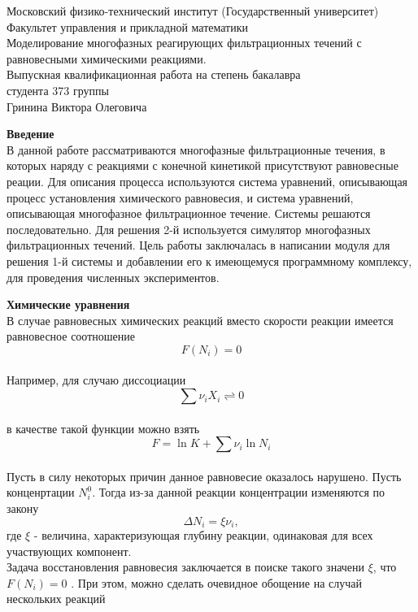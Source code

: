 \documentclass[10pt,a4paper]{article}
\begin{document}
\begin{center}
	Московский физико-технический институт (Государственный университет)\\
Факультет управления и прикладной математики\\
	\vspace{1cm} Моделирование многофазных реагирующих фильтрационных течений с 	равновесными химическими реакциями.\\
	\vspace{1cm}Выпускная квалификационная работа на степень бакалавра\\
			\vspace{1cm}студента 373 группы\\
	\vspace{1cm}Гринина Виктора Олеговича
	\vspace{4cm}
\end{center} 
\par\textbf{Введение}\\
В данной работе рассматриваются многофазные фильтрационные течения, в которых наряду с реакциями с конечной кинетикой присутствуют равновесные реации. Для описания процесса используются система уравнений, описывающая процесс установления химического равновесия, и система уравнений, описывающая  многофазное фильтрационное течение. Системы решаются последовательно. Для решения 2-й используется симулятор многофазных фильтрационных течений. Цель работы заключалась в написании модуля для решения 1-й системы и добавлении его к имеющемуся программному комплексу, для проведения численных экспериментов.
\par\textbf{Химические уравнения}\\
В случае равновесных химических реакций вместо скорости реакции имеется равновесное соотношение $$F(N_i) = 0$$\\
Например, для случаю диссоциации 
	$$\sum{\nu_i X_i} \rightleftharpoons 0$$\\
в качестве такой функции можно взять $$F = \ln{K} + \sum{\nu_i \ln{N_i}}$$\\
Пусть в силу  некоторых причин данное равновесие оказалось нарушено. Пусть конценртации $N_i^0$. Тогда из-за данной реакции концентрации изменяются по закону $$\Delta N_i = \xi \nu_i,$$ где $\xi$ - величина, характеризующая глубину реакции, одинаковая для всех участвующих компонент. \\
Задача восстановления равновесия заключается в поиске такого значени $\xi$, что $F(N_i) = 0$ . При этом, можно сделать очевидное обощение на случай нескольких реакций\\
\end{document}

